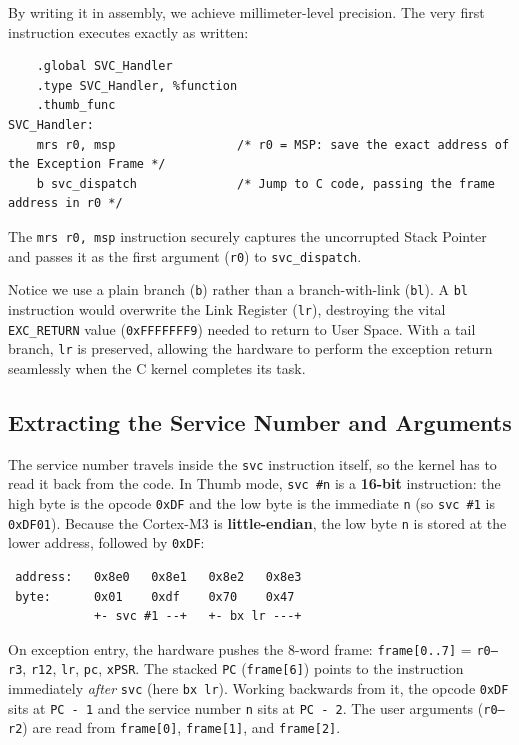 By writing it in assembly, we achieve millimeter-level precision. The very first instruction executes exactly as written:

\begin{lstlisting}
    .global SVC_Handler
    .type SVC_Handler, %function
    .thumb_func
SVC_Handler:
    mrs r0, msp                 /* r0 = MSP: save the exact address of the Exception Frame */
    b svc_dispatch              /* Jump to C code, passing the frame address in r0 */
\end{lstlisting}

The \texttt{mrs r0, msp} instruction securely captures the uncorrupted Stack Pointer and passes it as the first argument (\texttt{r0}) to \texttt{svc\_dispatch}. 

Notice we use a plain branch (\texttt{b}) rather than a branch-with-link (\texttt{bl}). A \texttt{bl} instruction would overwrite the Link Register (\texttt{lr}), destroying the vital \texttt{EXC\_RETURN} value (\texttt{0xFFFFFFF9}) needed to return to User Space. With a tail branch, \texttt{lr} is preserved, allowing the hardware to perform the exception return seamlessly when the C kernel completes its task.

\subsection{Extracting the Service Number and Arguments}
The service number travels inside the \texttt{svc} instruction itself, so the kernel has to read it back from the code. In Thumb mode, \texttt{svc \#n} is a \textbf{16-bit} instruction: the high byte is the opcode \texttt{0xDF} and the low byte is the immediate \texttt{n} (so \texttt{svc \#1} is \texttt{0xDF01}). Because the Cortex-M3 is \textbf{little-endian}, the low byte \texttt{n} is stored at the lower address, followed by \texttt{0xDF}:

\begin{verbatim}
 address:   0x8e0   0x8e1   0x8e2   0x8e3
 byte:      0x01    0xdf    0x70    0x47
            +- svc #1 --+   +- bx lr ---+
\end{verbatim}

On exception entry, the hardware pushes the 8-word frame: \texttt{frame[0..7]} = \texttt{r0--r3}, \texttt{r12}, \texttt{lr}, \texttt{pc}, \texttt{xPSR}. The stacked \texttt{PC} (\texttt{frame[6]}) points to the instruction immediately \textit{after} \texttt{svc} (here \texttt{bx lr}). Working backwards from it, the opcode \texttt{0xDF} sits at \texttt{PC - 1} and the service number \texttt{n} sits at \texttt{PC - 2}. The user arguments (\texttt{r0--r2}) are read from \texttt{frame[0]}, \texttt{frame[1]}, and \texttt{frame[2]}.

